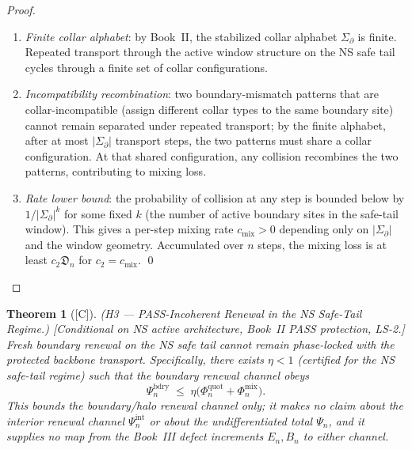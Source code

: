 \documentclass[12pt,oneside]{amsbook}
\theoremstyle{plain}
\newtheorem{theorem}{Theorem}[section]
\theoremstyle{definition}
\theoremstyle{remark}
\newcommand{\status}[1]{\textup{[#1]}}
\begin{document}
\begin{proof}
\begin{enumerate}[label=\textup{(\arabic*)}]
 \item \emph{Finite collar alphabet}: by Book~II, the stabilized
 collar alphabet $\Sigma_\partial$ is finite. Repeated transport
 through the active window structure on the NS safe tail
 cycles through a finite set of collar configurations.
 \item \emph{Incompatibility recombination}: two boundary-mismatch
 patterns that are collar-incompatible (assign different collar
 types to the same boundary site) cannot remain separated under
 repeated transport; by the finite alphabet, after at most
 $|\Sigma_\partial|$ transport steps, the two patterns must share
 a collar configuration. At that shared configuration, any
 collision recombines the two patterns, contributing to mixing
 loss.
 \item \emph{Rate lower bound}: the probability of collision
 at any step is bounded below by $1/|\Sigma_\partial|^{k}$ for
 some fixed $k$ (the number of active boundary sites in the
 safe-tail window). This gives a per-step mixing rate
 $c_{\mathrm{mix}} > 0$ depending only on
 $|\Sigma_\partial|$ and the window geometry. Accumulated over
 $n$ steps, the mixing loss is at least
 $c_2 \mathfrak{D}_n$ for $c_2 = c_{\mathrm{mix}}$. \qed
\end{enumerate}
\end{proof}

\begin{theorem}[\status{C}]\label{thm:NS-H3-PASS-incoherent}
\textup{(H3 --- PASS-Incoherent Renewal in the NS Safe-Tail Regime.)}
\textup{[Conditional on NS active architecture, Book~II PASS
protection, LS-2.]}
Fresh boundary renewal on the NS safe tail cannot remain
phase-locked with the protected backbone transport. Specifically,
there exists $\eta < 1$ (certified for the NS safe-tail regime)
such that the \emph{boundary} renewal channel obeys
\[
 \Psi_n^{\mathrm{bdry}} \;\leq\;
 \eta\bigl(\Phi_n^{\mathrm{quot}} + \Phi_n^{\mathrm{mix}}\bigr).
\]
This bounds the boundary/halo renewal channel only; it makes no
claim about the interior renewal channel $\Psi_n^{\mathrm{int}}$
or about the undifferentiated total $\Psi_n$, and it supplies no
map from the Book~III defect increments $E_n, B_n$ to either
channel.
\end{theorem}
\end{document}

